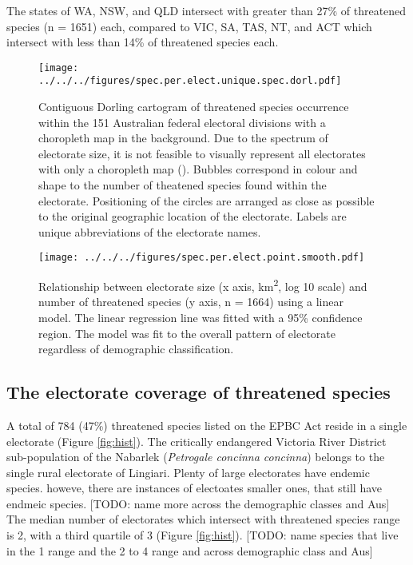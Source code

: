 \documentclass[a4paper,11pt]{article}
\begin{document}
The states of WA, NSW, and QLD intersect with greater than 27\% of threatened species (n = 1651) each, compared to VIC, SA, TAS, NT, and ACT which intersect with less than 14\% of threatened species each.


\begin{figure}[H]
	\centering
    \texttt{[image: ../../../figures/spec.per.elect.unique.spec.dorl.pdf]}
    \caption{Contiguous Dorling cartogram of threatened species occurrence within the 151 Australian federal electoral divisions with a choropleth map in the background. Due to the spectrum of electorate size, it is not feasible to visually represent all electorates with only a choropleth map (\cite{tomasettiMappingAustraliaElectorates2021}). Bubbles correspond in colour and shape to the number of theatened species found within the electorate. Positioning of the circles are arranged as close as possible to the original geographic location of the electorate. Labels are unique abbreviations of the electorate names.}
    \label{fig:dorl}
\end{figure}


\begin{figure}[H]
	\centering
    \texttt{[image: ../../../figures/spec.per.elect.point.smooth.pdf]}
    \caption{Relationship between electorate size (x axis, km\textsuperscript{2}, log 10 scale) and number of threatened species (y axis, n = 1664) using a linear model. The linear regression line was fitted with a 95\% confidence region. The model was fit to the overall pattern of electorate regardless of demographic classification.}
    \label{fig:point_smooth}
\end{figure}

\subsection{The electorate coverage of threatened species}

A total of 784 (47\%) threatened species listed on the EPBC Act reside in a single electorate (Figure \ref{fig:hist}).
The critically endangered Victoria River District sub-population of the Nabarlek (\emph{Petrogale concinna concinna}) belongs to the single rural electorate of Lingiari.
Plenty of large electorates have endemic species. howeve, there are instances of electoates smaller ones, that still have endmeic species.
[TODO: name more across the demographic classes and Aus]
The median number of electorates which intersect with threatened species range is 2, with a third quartile of 3 (Figure \ref{fig:hist}).
[TODO: name species that live in the 1 range and the 2 to 4 range and across demographic class and Aus]
\end{document}
